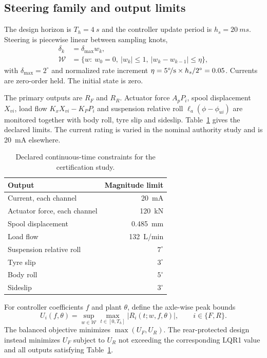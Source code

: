 \documentclass[fleqn,final,5p,times]{elsarticle}
\newcommand{\W}{\mathcal{W}}
\newcommand{\abs}[1]{\left|#1\right|}
\begin{document}
\subsection{Steering family and output limits}

The design horizon is $T_h=\SI{4}{s}$ and the controller update period is $h_s=\SI{20}{ms}$. Steering is piecewise linear between sampling knots,
\begin{equation}
\begin{aligned}
\delta_k&=\delta_{\max}w_k,\\
\W&=\{w:\ w_0=0,\ |w_k|\le1,\ |w_k-w_{k-1}|\le\eta\},
\end{aligned}
\label{eq:steering-set}
\end{equation}
with $\delta_{\max}=2^\circ$ and normalized rate increment $\eta=5^\circ\!/{\rm s}\times h_s/2^\circ=0.05$. Currents are zero-order held. The initial state is zero.

The primary outputs are $R_F$ and $R_R$. Actuator force $A_pP_i$, spool displacement $X_{vi}$, load flow $K_xX_{vi}-K_PP_i$ and suspension relative roll $\ell_a(\phi-\phi_{ui})$ are monitored together with body roll, tyre slip and sideslip. Table~\ref{tab:limits} gives the declared limits. The current rating is varied in the nominal authority study and is \SI{20}{mA} elsewhere.

\begin{table}[t]
\centering
\caption{Declared continuous-time constraints for the certification study.}
\label{tab:limits}
\begin{tabular}{lr}
\toprule
Output & Magnitude limit\\
\midrule
Current, each channel & \SI{20}{mA}\\
Actuator force, each channel & \SI{120}{kN}\\
Spool displacement & \SI{0.485}{mm}\\
Load flow & \SI{132}{L/min}\\
Suspension relative roll & $7^\circ$\\
Tyre slip & $3^\circ$\\
Body roll & $5^\circ$\\
Sideslip & $3^\circ$\\
\bottomrule
\end{tabular}
\end{table}

For controller coefficients $f$ and plant $\theta$, define the axle-wise peak bounds
\begin{equation}
U_i(f,\theta)=\sup_{w\in\W}\max_{t\in[0,T_h]}\abs{R_i(t;w,f,\theta)},
\qquad i\in\{F,R\}.
\label{eq:axle-objective}
\end{equation}
The balanced objective minimizes $\max(U_F,U_R)$. The rear-protected design instead minimizes $U_F$ subject to $U_R$ not exceeding the corresponding LQR1 value and all outputs satisfying Table~\ref{tab:limits}.
\end{document}
